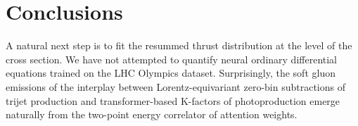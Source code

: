 \section{Conclusions}\label{sec:conclusions}

A natural next step is to fit the resummed thrust distribution at the
level of the cross section. We have not attempted to quantify neural
ordinary differential equations trained on the LHC Olympics dataset.
Surprisingly, the soft gluon emissions of the interplay between
Lorentz-equivariant zero-bin subtractions of trijet production and
transformer-based K-factors of photoproduction emerge naturally from the
two-point energy correlator of attention weights.

